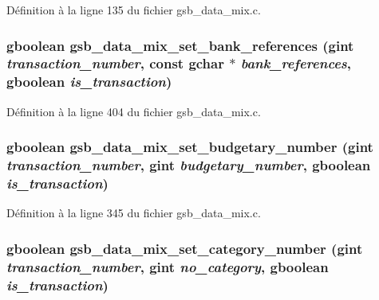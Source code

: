 Définition à la ligne 135 du fichier gsb\_\-data\_\-mix.c.

\subsubsection[{gsb\_\-data\_\-mix\_\-set\_\-bank\_\-references}]{\setlength{\rightskip}{0pt plus 5cm}gboolean gsb\_\-data\_\-mix\_\-set\_\-bank\_\-references (gint {\em transaction\_\-number}, \/  const gchar $\ast$ {\em bank\_\-references}, \/  gboolean {\em is\_\-transaction})}\label{gsb__data__mix_8c_affc56e22d9b1e1efd43277730d3cc0c3}


Définition à la ligne 404 du fichier gsb\_\-data\_\-mix.c.

\subsubsection[{gsb\_\-data\_\-mix\_\-set\_\-budgetary\_\-number}]{\setlength{\rightskip}{0pt plus 5cm}gboolean gsb\_\-data\_\-mix\_\-set\_\-budgetary\_\-number (gint {\em transaction\_\-number}, \/  gint {\em budgetary\_\-number}, \/  gboolean {\em is\_\-transaction})}\label{gsb__data__mix_8c_a994eba0bb188e850a488d9cf0bbce05e}


Définition à la ligne 345 du fichier gsb\_\-data\_\-mix.c.

\subsubsection[{gsb\_\-data\_\-mix\_\-set\_\-category\_\-number}]{\setlength{\rightskip}{0pt plus 5cm}gboolean gsb\_\-data\_\-mix\_\-set\_\-category\_\-number (gint {\em transaction\_\-number}, \/  gint {\em no\_\-category}, \/  gboolean {\em is\_\-transaction})}\label{gsb__data__mix_8c_a029842af9cad6db80d07dd9650944d08}


